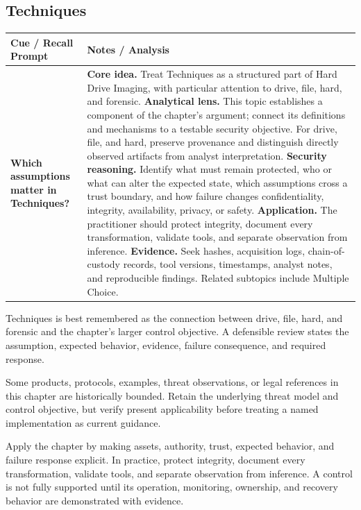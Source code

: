 \documentclass[11pt]{article}
\newcommand{\CornellHeader}{%
\rowcolor{Navy}\color{white}\bfseries Cue / Recall Prompt & \color{white}\bfseries Notes / Analysis\\\hline}
\newcommand{\CornellRow}[2]{%
\cellcolor{CueGray}\RaggedRight\textbf{#1} & \RaggedRight #2\\\hline}
\begin{document}
\subsection*{Techniques}
\begin{longtable}{>{\RaggedRight\arraybackslash}p{}|>{\RaggedRight\arraybackslash}p{}}
\CornellHeader
\CornellRow{Which assumptions matter in Techniques?}{\textbf{Core idea.} Treat Techniques as a structured part of Hard Drive Imaging, with particular attention to drive, file, hard, and forensic. \textbf{Analytical lens.} This topic establishes a component of the chapter's argument; connect its definitions and mechanisms to a testable security objective. For drive, file, and hard, preserve provenance and distinguish directly observed artifacts from analyst interpretation. \textbf{Security reasoning.} Identify what must remain protected, who or what can alter the expected state, which assumptions cross a trust boundary, and how failure changes confidentiality, integrity, availability, privacy, or safety. \textbf{Application.} The practitioner should protect integrity, document every transformation, validate tools, and separate observation from inference. \textbf{Evidence.} Seek hashes, acquisition logs, chain-of-custody records, tool versions, timestamps, analyst notes, and reproducible findings. Related subtopics include Multiple Choice.}
\end{longtable}
\begin{topicsummary}
Techniques is best remembered as the connection between drive, file, hard, and forensic and the chapter's larger control objective. A defensible review states the assumption, expected behavior, evidence, failure consequence, and required response.
\end{topicsummary}
\begin{historybox}
Some products, protocols, examples, threat observations, or legal references in this chapter are historically bounded. Retain the underlying threat model and control objective, but verify present applicability before treating a named implementation as current guidance.
\end{historybox}
\begin{defensebox}
Apply the chapter by making assets, authority, trust, expected behavior, and failure response explicit. In practice, protect integrity, document every transformation, validate tools, and separate observation from inference. A control is not fully supported until its operation, monitoring, ownership, and recovery behavior are demonstrated with evidence.
\end{defensebox}
\end{document}
